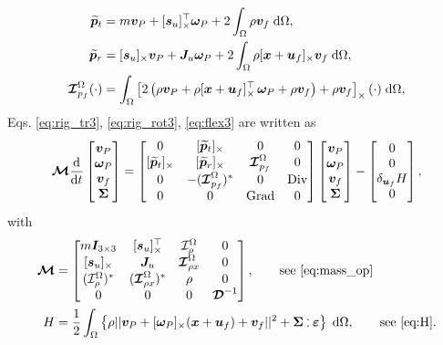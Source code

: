 \documentclass{svjour3}                     %
\DeclareMathOperator*{\Grad}{Grad}
\DeclareMathOperator*{\Div}{Div}
\newcommand{\crmat}[1]{\ensuremath{[#1]_{\times}}}
\def\onedot{$\mathsurround0pt\ldotp$}
\def\cddot{%
	\mathbin{\vcenter{\baselineskip.67ex
			\hbox{\onedot}\hbox{\onedot}}%
}}
\begin{document}
\begin{align*}
	\widetilde{\bm{p}}_t &= m \bm{v}_P + \crmat{\bm{s}_u}^\top \bm\omega_P +2 \int_{\Omega} \rho \bm{v}_f \d{\Omega}, \\
	\widetilde{\bm{p}}_r &= \crmat{\bm{s}_u} \bm{v}_P + \bm{J}_u \bm\omega_P + 2 \int_{\Omega} \rho \crmat{\bm{x}+\bm{u}_f} {\bm{v}}_f \d{\Omega}, \\
	\bm{\mathcal{I}}_{p_f}^\Omega(\cdot) &= \int_{\Omega} \left[ 2 \left(\rho \bm{v}_P + \rho \crmat{\bm{x}+\bm{u}_f}^\top \, \bm\omega_P +\rho \bm{v}_f\right) + \rho \bm{v}_f \right]_\times (\cdot) \d{\Omega}, 
\end{align*}
Eqs. \eqref{eq:rig_tr3}, \eqref{eq:rig_rot3}, \eqref{eq:flex3} are written as 
\begin{equation}
\bm{\mathcal{M}}
\diff{}{t}
\begin{bmatrix}
	\bm{v}_P \\ \bm\omega_P  \\ \bm{v}_f  \\ \bm\Sigma \\
	\end{bmatrix} = 
	\begin{bmatrix}
	 0 & \crmat{\widetilde{\bm{p}}_t} & 0 & 0 \\
	\crmat{\widetilde{\bm{p}}_t} & \crmat{\widetilde{\bm{p}}_r} & \bm{\mathcal{I}}_{p_f}^\Omega & 0 \\
	0 & -(\bm{\mathcal{I}}_{p_f}^\Omega)^* & 0 & \Div \\
	0 & 0 & \Grad & 0 \\
	\end{bmatrix}
\begin{bmatrix}
	\bm{v}_P \\ \bm\omega_P  \\ \bm{v}_f  \\ \bm\Sigma \\
	\end{bmatrix} - 
	\begin{bmatrix}
	0 \\ 0  \\ \delta_{\bm{u}_f}H  \\ 0 \\
	\end{bmatrix},
\end{equation} 
with
\begin{align*}
\bm{\mathcal{M}} &= 
\begin{bmatrix}
m \bm{I}_{3\times 3} & \crmat{\bm{s}_u}^\top & \mathcal{I}_\rho^{\Omega} & 0 \\
\crmat{\bm{s}_u} & \bm{J}_u & \bm{\mathcal{I}}_{\rho x}^{\Omega} & 0  \\
(\mathcal{I}_\rho^{\Omega})^* & (\bm{\mathcal{I}}_{\rho x}^{\Omega})^* & \rho & 0  \\
0 & 0 & 0 & \bm{\mathcal{D}}^{-1} \\
\end{bmatrix}, \qquad \text{see \eqref{eq:mass_op}} \\
H &= \frac{1}{2} \int_{\Omega} \left\{\rho ||\bm{v}_P + \crmat{\bm{\omega}_P} (\bm{x}+\bm{u}_f) + {\bm{v}}_f||^2 + \bm\Sigma \cddot \bm\varepsilon \right\}  \d{\Omega}, \qquad \text{see \eqref{eq:H}}.
\end{align*}
\end{document}
